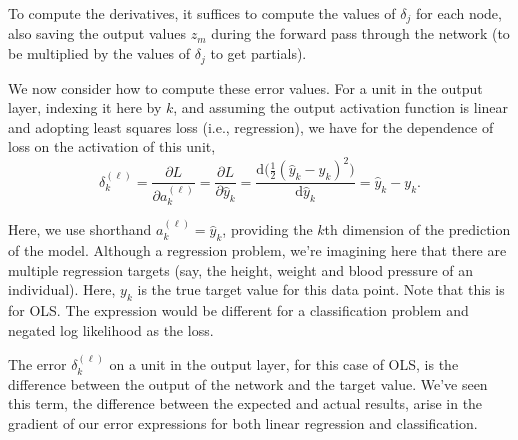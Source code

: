 To compute the derivatives, it suffices to compute the values of $\delta_{j}$ for each node, also saving the output values  $z_{m}$ during the forward pass through the network (to be multiplied by the values of $\delta_{j}$ to get partials).


We now consider how to compute these error values.  For a unit in the output layer, indexing it here by $k$,  and assuming the output activation function is linear and adopting least squares loss (i.e., regression), we have  for the dependence of loss on the activation of this unit,
%
\begin{equation*}
  \delta^{(\ell)}_{k} = \frac{\partial L}{\partial a^{(\ell)}_k} =
 \frac{\partial L}{\partial \hat{y}_k} =
  \frac{\mathrm{d} \big( \frac{1}{2}(\hat{y}_k- y_k)^2 \big)}{\mathrm{d} \hat{y}_{k}} = \hat{y}_{k} - y_{k}.
\end{equation*}

Here, we use shorthand $a^{(\ell)}_k=\hat{y}_k$, providing the $k$th dimension of the  prediction  of the  model. Although a regression problem, we're imagining here that there are multiple regression targets (say, the height, weight and blood pressure of an individual). Here, $y_k$ is the true target value for this data point. Note that this is for OLS. The expression would be different for a classification problem and negated log likelihood as the loss.

The error $\delta_k^{(\ell)}$ on a unit in the output layer, for this case of OLS, is the difference between the output of the network and the target value. We've seen this term, the difference between the expected and actual results, arise in the gradient of our error expressions for both linear regression and classification.
\fi

